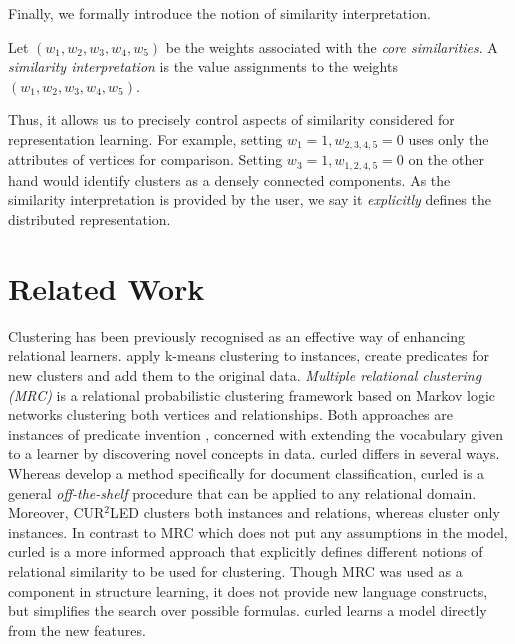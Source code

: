 Finally, we formally introduce the notion of similarity interpretation.

\begin{definition}
Let $(w_1,w_2,w_3,w_4,w_5)$ be the weights associated with the \textit{core similarities}.
A \textit{similarity interpretation} is the value assignments to the weights $(w_1,w_2,w_3,w_4,w_5)$.
\end{definition}

Thus, it allows us to precisely control aspects of similarity considered for representation learning.
For example, setting $w_1 = 1, w_{2,3,4,5} = 0$ uses only the attributes of vertices for comparison.
Setting $w_3 = 1, w_{1,2,4,5} = 0$ on the other hand would identify clusters as a densely connected components.
As the similarity interpretation is provided by the user, we say it \textit{explicitly} defines the distributed representation.




\section{Related Work}
\label{sec:Related}

Clustering has been previously recognised as an effective way of enhancing relational learners.
\cite{Popescul2004}  apply k-means clustering to instances, create predicates for new clusters and add them to the original data.
\textit{Multiple relational clustering (MRC)} \cite{Kok2007,Kok2008} is a relational probabilistic clustering framework based on Markov logic networks \cite{Richardson2006} clustering both vertices and relationships.
Both approaches are instances of predicate invention \cite{Kramer1995,Craven2001}, concerned with extending the vocabulary given to a learner by discovering novel concepts in data.
\gls{curled} differs in several ways.
Whereas \cite{Popescul2004} develop a method specifically  for document classification, \gls{curled} is a general \textit{off-the-shelf} procedure that can be applied to any relational domain.
Moreover, CUR$^2$LED clusters both instances and relations, whereas \cite{Popescul2004} cluster only instances.
In contrast to MRC which does not put any assumptions in the model, \gls{curled} is a more informed approach that explicitly defines different notions of relational similarity to be used for clustering.
Though MRC was used as a component in structure learning, it does not provide new language constructs, but simplifies the search over possible formulas.
\gls{curled} learns a model directly from the new features.


